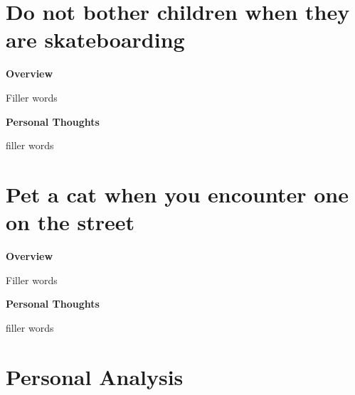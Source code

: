 \documentclass{article}
\begin{document}
\section{Do not bother children when they are skateboarding}
        \begin{multicols}{2}
        \begin{center}
            \textbf{Overview}
        \end{center}
        
        Filler words 

        \begin{center}
            \textbf{Personal Thoughts}
        \end{center}
        
        filler words
    \end{multicols}
    
\section{Pet a cat when you encounter one on the street}
        \begin{multicols}{2}
        \begin{center}
        \textbf{Overview}
        \end{center}
        
        Filler words 

        \begin{center}
            \textbf{Personal Thoughts}
        \end{center}
        
        filler words
    \end{multicols}
\section{Personal Analysis}
\end{document}
